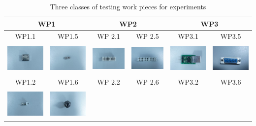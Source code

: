 \documentclass[journal]{IEEEtran}
\begin{document}
\begin{table}[!t]
\caption{Three classes of testing work pieces for experiments}
\begin{center}
\begin{tabular}{|c|c||c|c||c|c|}
\hline
\multicolumn{2}{|c||}{\bf{WP1}} & \multicolumn{2}{c||}{\bf{WP2}} & \multicolumn{2}{c|}{\bf{WP3}}\\
\hline\hline
WP1.1 & WP1.5 & WP 2.1 & WP 2.5 & WP3.1 & WP3.5\\
\hline
\includegraphics[width=1in,height=0.6in]{j_img/wp11.jpg} & 
\includegraphics[width=1in,height=0.6in]{j_img/wp15.jpg} & 
\includegraphics[width=1in,height=0.6in]{j_img/wp21.jpg} & 
\includegraphics[width=1in,height=0.6in]{j_img/wp25.jpg} &
\includegraphics[width=1in,height=0.6in]{j_img/wp31.jpg} & 
\includegraphics[width=1in,height=0.6in]{j_img/wp35.jpg} \\
\hline
WP1.2 & WP1.6 & WP 2.2 & WP 2.6 & WP3.2 & WP3.6\\
\hline
\includegraphics[width=1in,height=0.6in]{j_img/wp12.jpg} & 
\includegraphics[width=1in,height=0.6in]{j_img/wp16.jpg} & 

\end{tabular}
\end{center}
\end{table}
\end{document}

